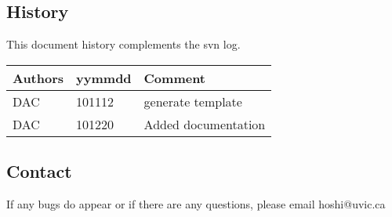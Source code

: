 \subsection{History} 
This document history complements the svn log.

\begin{tabular*}{\textwidth}{lll}
\hline
Authors & yymmdd & Comment \\
\hline
DAC & 101112 & generate template \\
DAC & 101220 & Added documentation \\
\hline
\end{tabular*}


\subsection{Contact}
If any bugs do appear or if there are any questions, please email hoshi@uvic.ca
\begin{verbatim}

\end{verbatim}


%
%
%
%
